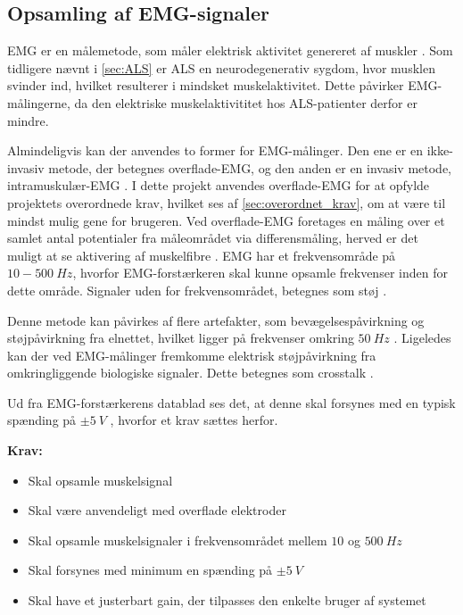 \subsection{Opsamling af EMG-signaler} \label{sec:EMG_krav}
EMG er en målemetode, som måler elektrisk aktivitet genereret af muskler \citep{chowdhury2013}. 
Som tidligere nævnt i \autoref{sec:ALS} er ALS en neurodegenerativ sygdom, hvor musklen svinder ind, hvilket resulterer i mindsket muskelaktivitet. Dette påvirker EMG-målingerne, da den elektriske muskelaktivititet hos ALS-patienter derfor er mindre.

Almindeligvis kan der anvendes to former for EMG-målinger. Den ene er en ikke-invasiv metode, der betegnes overflade-EMG, og den anden er en invasiv metode, intramuskulær-EMG \citep{chowdhury2013, keenan2012}. I dette projekt anvendes overflade-EMG for at opfylde projektets overordnede krav, hvilket ses af \autoref{sec:overordnet_krav}, om at være til mindst mulig gene for brugeren. Ved overflade-EMG foretages en måling over et samlet antal potentialer fra måleområdet via differensmåling, herved er det muligt at se aktivering af muskelfibre \citep{keenan2012}. EMG har et frekvensområde på $10-500~Hz$, hvorfor EMG-forstærkeren skal kunne opsamle frekvenser inden for dette område. Signaler uden for frekvensområdet, betegnes som støj \citep{morre2003, keenan2012}.  

Denne metode kan påvirkes af flere artefakter, som bevægelsespåvirkning og støjpåvirkning fra elnettet, hvilket ligger på frekvenser omkring $50~Hz$ \citep{keenan2012}.
Ligeledes kan der ved EMG-målinger fremkomme elektrisk støjpåvirkning fra omkringliggende biologiske signaler. Dette betegnes som crosstalk \citep{keenan2012}. 

Ud fra EMG-forstærkerens datablad ses det, at denne skal forsynes med en typisk spænding på $\pm 5~V$ \citep{advancertech2013}, hvorfor et krav sættes herfor.

\vspace{3mm}
\textbf{Krav:}
\begin{itemize}
\item Skal opsamle muskelsignal
\item Skal være anvendeligt med overflade elektroder
\item Skal opsamle muskelsignaler i frekvensområdet mellem $10$ og $500~Hz$
\item Skal forsynes med minimum en spænding på $\pm5~V$ 
\item Skal have et justerbart gain, der tilpasses den enkelte bruger af systemet
\end{itemize}